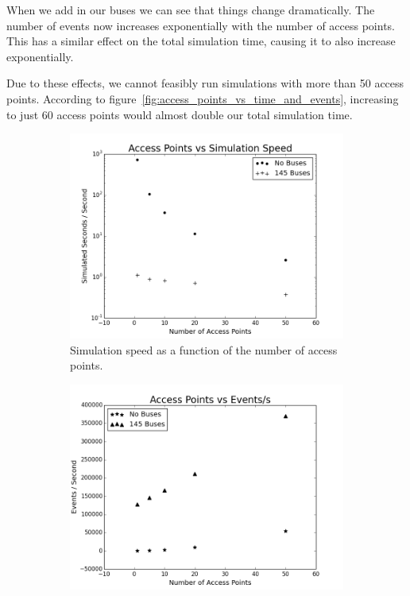             When we add in our buses we can see that things change dramatically. The number of events now increases exponentially with the number of access points. This has a similar effect on the total simulation time, causing it to also increase exponentially. 

            Due to these effects, we cannot feasibly run simulations with more than 50 access points. According to figure~\ref{fig:access_points_vs_time_and_events}, increasing to just 60 access points would almost double our total simulation time. 

            \begin{figure}
                \centering
                \begin{subfigure}{0.5\textwidth}
                    \centering
                    \includegraphics[width=\linewidth]{./images/AP_vs_Simulation_Speed.png}
                    \caption{Simulation speed as a function of the number of access points.}
                    \label{fig:access_points_speed}
                \end{subfigure}%
                \begin{subfigure}{0.5\textwidth}
                    \includegraphics[width=\linewidth]{./images/AP_vs_Events.png}

\end{subfigure}
\end{figure}
